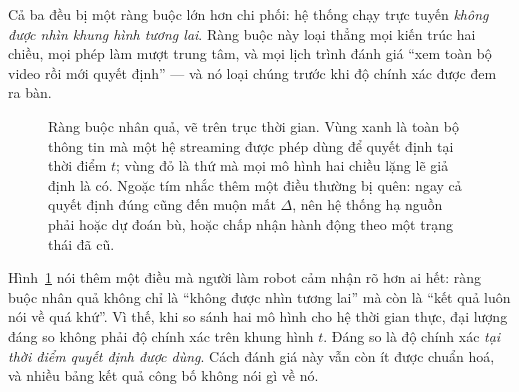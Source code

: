 \documentclass[../../../deep_learning.tex]{subfiles}
\begin{document}
Cả ba đều bị một ràng buộc lớn hơn chi phối: hệ thống chạy trực tuyến \emph{không được nhìn khung hình tương lai}. Ràng buộc này loại thẳng mọi kiến trúc hai chiều, mọi phép làm mượt trung tâm, và mọi lịch trình đánh giá ``xem toàn bộ video rồi mới quyết định'' --- và nó loại chúng trước khi độ chính xác được đem ra bàn.

\begin{figure}[H]\centering
{}
\caption{Ràng buộc nhân quả, vẽ trên trục thời gian. Vùng xanh là toàn bộ thông tin mà một hệ streaming được phép dùng để quyết định tại thời điểm \(t\); vùng đỏ là thứ mà mọi mô hình hai chiều lặng lẽ giả định là có. Ngoặc tím nhắc thêm một điều thường bị quên: ngay cả quyết định đúng cũng đến muộn mất \(\Delta\), nên hệ thống hạ nguồn phải hoặc dự đoán bù, hoặc chấp nhận hành động theo một trạng thái đã cũ.}
\label{fig:causal-window}
\end{figure}

Hình~\ref{fig:causal-window} nói thêm một điều mà người làm robot cảm nhận rõ hơn ai hết: ràng buộc nhân quả không chỉ là ``không được nhìn tương lai'' mà còn là ``kết quả luôn nói về quá khứ''. Vì thế, khi so sánh hai mô hình cho hệ thời gian thực, đại lượng đáng so không phải độ chính xác trên khung hình \(t\). Đáng so là độ chính xác \emph{tại thời điểm quyết định được dùng}. Cách đánh giá này vẫn còn ít được chuẩn hoá, và nhiều bảng kết quả công bố không nói gì về nó.
\end{document}
